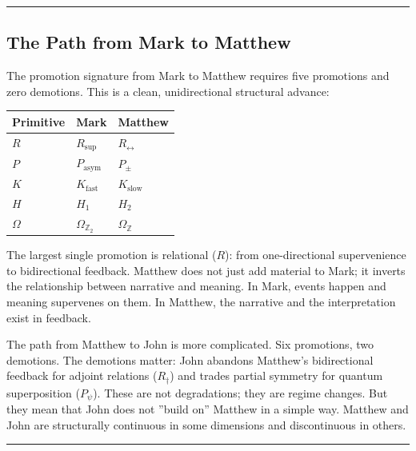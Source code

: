 \documentclass[12pt,a4paper]{article}
\begin{document}
\begin{center}
\rule{0.5\textwidth}{0.4pt}
\end{center}

\subsection{The Path from Mark to Matthew}

The promotion signature from Mark to Matthew requires five promotions and zero demotions. This is a clean, unidirectional structural advance:

\begin{table}[htbp]
\centering
\small
{}
\begin{tabularx}{\textwidth}{>{\centering\arraybackslash}X >{\centering\arraybackslash}X >{\centering\arraybackslash}X}
\toprule
\rowcolor{gray!25}\textbf{Primitive} & \textbf{Mark} & \textbf{Matthew} \\
\midrule
\rowcolors{1}{white}{gray!10}
$R$ & $R_\text{sup}$ & $R_{\leftrightarrow}$ \\
$P$ & $P_\text{asym}$ & $P_{\pm}$ \\
$K$ & $K_\text{fast}$ & $K_\text{slow}$ \\
$H$ & $H_1$ & $H_2$ \\
$\Omega$ & $\Omega_{\mathbb{Z}_2}$ & $\Omega_\mathbb{Z}$ \\
\bottomrule
\end{tabularx}
\end{table}

The largest single promotion is relational ($R$): from one-directional supervenience to bidirectional feedback. Matthew does not just add material to Mark; it inverts the relationship between narrative and meaning. In Mark, events happen and meaning supervenes on them. In Matthew, the narrative and the interpretation exist in feedback.

The path from Matthew to John is more complicated. Six promotions, two demotions. The demotions matter: John abandons Matthew's bidirectional feedback for adjoint relations ($R_{\dagger}$) and trades partial symmetry for quantum superposition ($P_{\psi}$). These are not degradations; they are regime changes. But they mean that John does not ''build on'' Matthew in a simple way. Matthew and John are structurally continuous in some dimensions and discontinuous in others.

\begin{center}
\rule{0.5\textwidth}{0.4pt}
\end{center}
\end{document}
